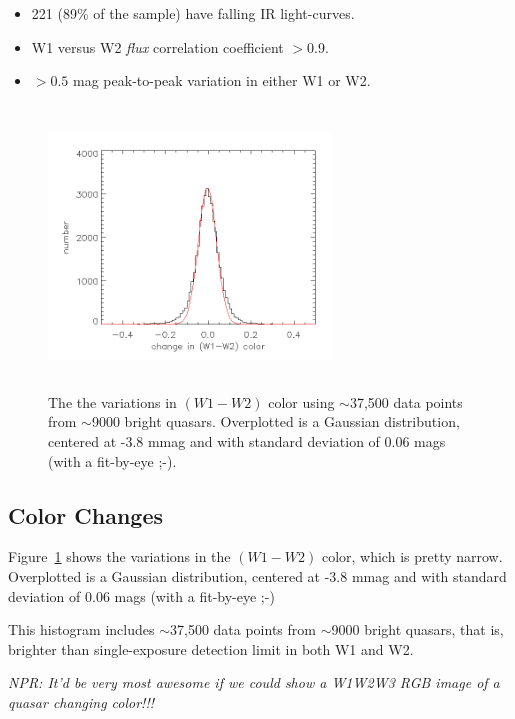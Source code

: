 \documentclass{emulateapj}
\begin{document}
\begin{itemize}
    \item{221 (89\% of the sample) have falling IR light-curves.}
    \item W1 versus W2 \textit{flux} correlation coefficient $>$0.9.
    \item $>0.5$ mag peak-to-peak variation in either W1 or W2.
\end{itemize}
 

\begin{figure}
  \includegraphics[width=7.50cm, height=7.50cm, 
  trim=0.0cm 0.0cm 0.0cm 0.0cm, clip]
  {w1w2_color_variation.png}
  \centering
  \caption[]{The the variations in $(W1-W2)$ color using
    $\sim$37,500 data points from $\sim$9000 bright quasars.
    Overplotted is a Gaussian distribution, centered at -3.8 mmag 
    and with standard deviation of 0.06 mags (with a fit-by-eye ;-).}
  \label{fig:w1w2_color_variation}
\end{figure}
\subsection{Color Changes}
Figure~\ref{fig:w1w2_color_variation} shows the variations in the
$(W1-W2)$ color, which is pretty narrow. Overplotted is a Gaussian
distribution, centered at -3.8 mmag and with standard deviation of
0.06 mags (with a fit-by-eye ;-)

This histogram includes $\sim$37,500 data points from $\sim$9000
bright quasars, that is, brighter than single-exposure detection limit in both
W1 and W2. 

    {\it NPR: It'd be very most awesome if we could show a
      W1W2W3 RGB image of a quasar changing color!!!}
\end{document}

